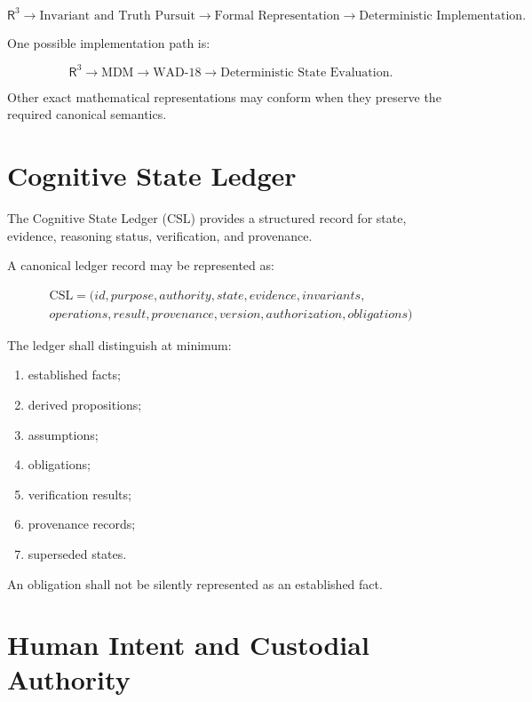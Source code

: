 \documentclass[11pt]{article}
\newcommand{\Rthree}{\ensuremath{\mathsf{R}^{3}}}
\newcommand{\MDM}{\ensuremath{\mathrm{MDM}}}
\newcommand{\WAD}{\ensuremath{\mathrm{WAD\mbox{-}18}}}
\newcommand{\CSL}{\ensuremath{\mathrm{CSL}}}
\begin{document}
\[
\boxed{
\Rthree{}
\rightarrow
\text{Invariant and Truth Pursuit}
\rightarrow
\text{Formal Representation}
\rightarrow
\text{Deterministic Implementation}.
}
\]

One possible implementation path is:

\[
\boxed{
\Rthree{}
\rightarrow
\MDM
\rightarrow
\WAD{}
\rightarrow
\text{Deterministic State Evaluation}.
}
\]

Other exact mathematical representations may conform when they
preserve the required canonical semantics.

\section{Cognitive State Ledger}

The Cognitive State Ledger (\CSL{}) provides a structured record
for state, evidence, reasoning status, verification, and
provenance.

A canonical ledger record may be represented as:

\[
\boxed{
\begin{gathered}
\CSL=
(
id,
purpose,
authority,
state,
evidence,
invariants,\\
operations,
result,
provenance,
version,
authorization,
obligations
)
\end{gathered}
}
\]

The ledger shall distinguish at minimum:

\begin{enumerate}
    \item established facts;
    \item derived propositions;
    \item assumptions;
    \item obligations;
    \item verification results;
    \item provenance records;
    \item superseded states.
\end{enumerate}

An obligation shall not be silently represented as an established
fact.

\section{Human Intent and Custodial Authority}
\end{document}
